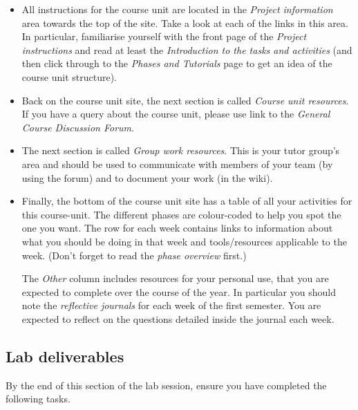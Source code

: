 \begin{itemize}
\item 
All instructions for the course unit are located in the \emph{Project information} area towards the top of the site. Take a look at each of the links in this area. In particular, familiarise yourself with the front page of the \emph{Project instructions} and read at least the \emph{Introduction to the tasks and activities} (and then click through to the \emph{Phases and Tutorials} page to get an idea of the course unit structure).

\item Back on the course unit site, the next section is called \emph{Course unit resources}. If you have a query about the course unit, please use link to the \emph{General Course Discussion Forum}.

\item The next section is called \emph{Group work resources}. This is your tutor group's area and should be used to communicate with members of your team (by using the forum) and to document your work (in the wiki).

\item Finally, the bottom of the course unit site has a table of all your activities for this course-unit. The different phases are colour-coded to help you spot the one you want. The row for each week contains links to information about what you should be doing in that week and tools/resources applicable to the week. (Don't forget to read the \emph{phase overview} first.)

  The \emph{Other}  column includes resources for your personal use, that you are expected to complete over the course of the year. In particular you should note the \emph{reflective journals} for each week of the first semester. You are expected to reflect on the questions detailed inside the journal each week.
\end{itemize}


\subsection{Lab deliverables}
\label{sec:lab-deliverables}

By the end of this section of the lab session, ensure you have completed the following tasks.

